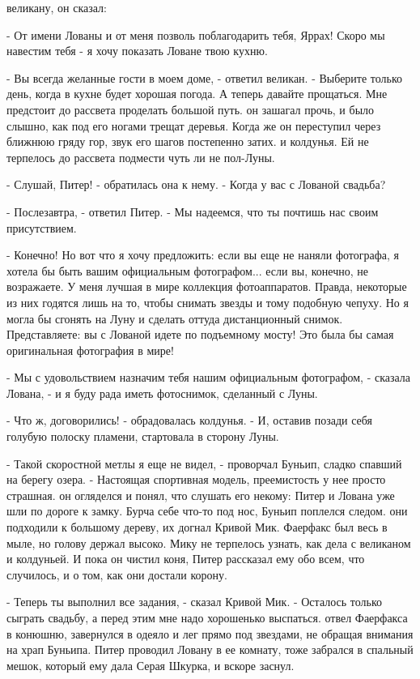 великану, он сказал:
\par- От имени Лованы и от меня позволь поблагодарить тебя, Яррах! 
Скоро мы навестим тебя - я хочу показать Ловане твою кухню.
\par- Вы всегда желанные гости в моем доме, - ответил великан. - 
Выберите только день, когда в кухне будет хорошая погода. А теперь 
давайте прощаться. Мне предстоит до рассвета проделать большой путь.
 он зашагал прочь, и было слышно, как под его ногами трещат 
деревья. Когда же он переступил через ближнюю гряду гор, звук его 
шагов постепенно затих.
 и колдунья. Ей не терпелось до рассвета подмести чуть 
ли не пол-Луны.
\par- Слушай, Питер! - обратилась она к нему. - Когда у вас с Лованой 
свадьба?
\par- Послезавтра, - ответил Питер. - Мы надеемся, что ты почтишь нас 
своим присутствием.
\par- Конечно! Но вот что я хочу предложить: если вы еще не наняли 
фотографа, я хотела бы быть вашим официальным фотографом... если вы, 
конечно, не возражаете. У меня лучшая в мире коллекция фотоаппаратов. 
Правда, некоторые из них годятся лишь на то, чтобы снимать звезды и 
тому подобную чепуху. Но я могла бы сгонять на Луну и сделать оттуда 
дистанционный снимок. Представляете: вы с Лованой идете по подъемному 
мосту! Это была бы самая оригинальная фотография в мире!
\par- Мы с удовольствием назначим тебя нашим официальным фотографом, - 
сказала Лована, - и я буду рада иметь фотоснимок, сделанный с Луны.
\par- Что ж, договорились! - обрадовалась колдунья. - И, оставив 
позади себя голубую полоску пламени, стартовала в сторону Луны.
\par- Такой скоростной метлы я еще не видел, - проворчал Буньип, 
сладко спавший на берегу озера. - Настоящая спортивная модель, 
преемистость у нее просто страшная.
 он огляделся и понял, что слушать его некому: Питер и Лована 
уже шли по дороге к замку. Бурча себе что-то под нос, Буньип поплелся 
следом.
 они подходили к большому дереву, их догнал Кривой Мик. 
Фаерфакс был весь в мыле, но голову держал высоко.
 Мику не терпелось узнать, как дела с великаном и 
колдуньей. И пока он чистил коня, Питер рассказал ему обо всем, что 
случилось, и о том, как они достали корону.
\par- Теперь ты выполнил все задания, - сказал Кривой Мик. - Осталось 
только сыграть свадьбу, а перед этим мне надо хорошенько выспаться.
 отвел Фаерфакса в конюшню, завернулся в одеяло и лег прямо под 
звездами, не обращая внимания на храп Буньипа. Питер проводил Ловану в 
ее комнату, тоже забрался в спальный мешок, который ему дала Серая 
Шкурка, и вскоре заснул.
